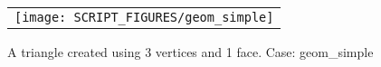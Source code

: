 \documentclass[12pt]{article}
\begin{document}
\begin{figure}
\begin{center}
\begin{tabular}{c}
 \texttt{[image: SCRIPT\_FIGURES/geom\_simple]}
  \end{tabular}
\end{center}
 \caption{A triangle created using 3 vertices and 1 face. Case: geom\_simple}
\label{fig:geom_simple}
\end{figure}

%
%
%
%
%
%
%
%
\end{document}
